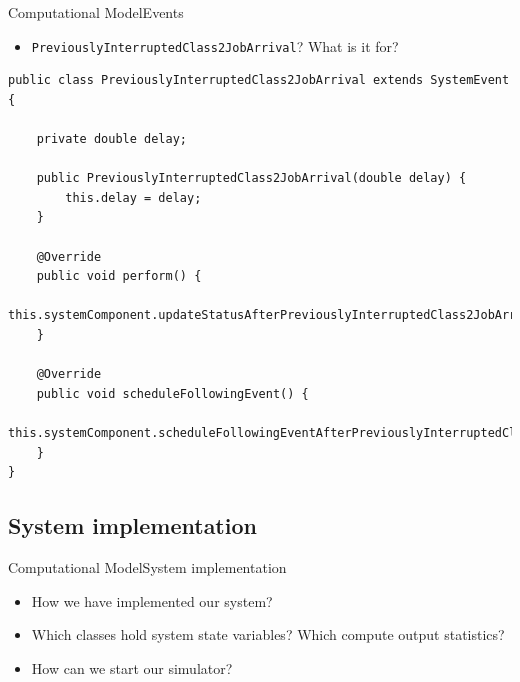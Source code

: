 \documentclass[10pt]{beamer}
\begin{document}
\begin{frame}[fragile]{Computational Model}{Events}

\begin{itemize}
\item \texttt{PreviouslyInterruptedClass2JobArrival}? What is it for?
\end{itemize}


\begin{lstlisting}[frame=lines, caption={\texttt{PreviouslyInterruptedClass2JobArrival} class}]
public class PreviouslyInterruptedClass2JobArrival extends SystemEvent {

    private double delay;

    public PreviouslyInterruptedClass2JobArrival(double delay) {
        this.delay = delay;
    }

    @Override
    public void perform() {
        this.systemComponent.updateStatusAfterPreviouslyInterruptedClass2JobArrival(this.delay);
    }

    @Override
    public void scheduleFollowingEvent() {
        this.systemComponent.scheduleFollowingEventAfterPreviouslyInterruptedClass2JobArrival();
    }
}
\end{lstlisting}
\end{frame}











\subsection{System implementation}
\begin{frame}{Computational Model}{System implementation}

\begin{itemize}
\item How we have implemented our system? 
\item Which classes hold system state variables? Which compute output statistics?
\item How can we start our simulator?
\end{itemize}
\end{frame}
\end{document}
